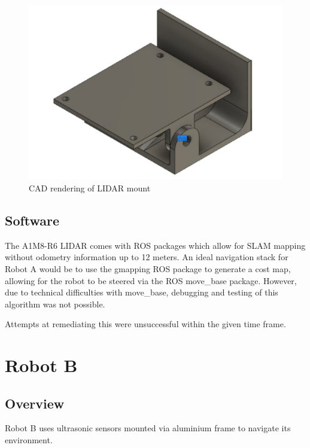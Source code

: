 \documentclass[11pt]{article}
\begin{document}
	\begin{figure}[h!]
		\centering
		\includegraphics[scale=0.6]{lidar_mount}
		\caption{CAD rendering of LIDAR mount}
	\end{figure}
	
	\subsection{Software}
	The A1M8-R6 LIDAR comes with ROS packages which allow for SLAM mapping without odometry information up to 12 meters. An ideal navigation stack for Robot A would be to use the gmapping ROS package to generate a cost map, allowing for the robot to be steered via the ROS move\_base package. However, due to technical difficulties with move\_base, debugging and testing of this algorithm was not possible. \newline
	
	Attempts at remediating this were unsuccessful within the given time frame.
	
	\pagebreak

	\section{Robot B}
	
	\subsection{Overview}
	Robot B uses ultrasonic sensors mounted via aluminium frame to navigate its environment.
	
\end{document}
